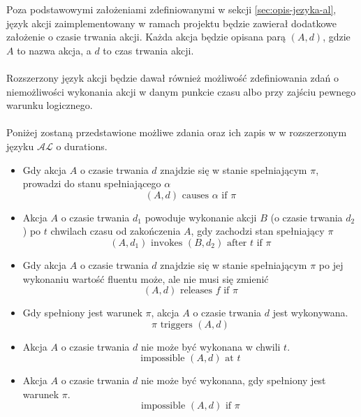 \documentclass{article}
\begin{document}
Poza podstawowymi założeniami zdefiniowanymi w sekcji \ref{sec:opis-jezyka-al}, język akcji zaimplementowany w ramach projektu będzie zawierał dodatkowe założenie o czasie trwania akcji. Każda akcja będzie opisana parą $(A, d)$, gdzie $A$ to nazwa akcja, a $d$ to czas trwania akcji.
\\ \\
Rozszerzony język akcji będzie dawał również możliwość zdefiniowania zdań o niemożliwości wykonania akcji w danym punkcie czasu albo przy zajściu pewnego warunku logicznego. 
\\ \\
Poniżej zostaną przedstawione możliwe zdania oraz ich zapis w w rozszerzonym języku $\mathcal{AL}$ o durations.
\begin{itemize}
    \item Gdy akcja $A$ o czasie trwania $d$ znajdzie się w stanie spełniającym $\pi$, prowadzi do stanu spełniającego $\alpha$
    \begin{equation}
     	(A, d) \text{ causes } \alpha \text{ if } \pi
    \end{equation}

    \item Akcja $A$ o czasie trwania $d_1$ powoduje wykonanie akcji $B$ (o czasie trwania $d_2$) po $t$ chwilach czasu od zakończenia $A$, gdy zachodzi stan spełniający $\pi$
    \begin{equation}
    	(A, d_1) \text{ invokes } (B, d_2) \text{ after } t \text{ if } \pi
    \end{equation}

    \item Gdy akcja $A$ o czasie trwania $d$ znajdzie się w stanie spełniającym $\pi$ po jej wykonaniu wartość fluentu może, ale nie musi się zmienić
    \begin{equation}
        (A, d) \text{ releases } f \text{ if } \pi
    \end{equation}

    \item Gdy spełniony jest warunek $\pi$, akcja $A$ o czasie trwania $d$ jest wykonywana.
    \begin{equation}
        \pi \text{ triggers } (A, d)
    \end{equation}

	\item Akcja $A$ o czasie trwania $d$ nie może być wykonana w chwili $t$.
    \begin{equation}
		\text{impossible } (A, d) \text{ at } t
    \end{equation}

	\item Akcja $A$ o czasie trwania $d$ nie może być wykonana, gdy spełniony jest warunek $\pi$.
	\begin{equation}
		\text{impossible } (A, d) \text{ if } \pi
	\end{equation}
\end{itemize}
\end{document}
